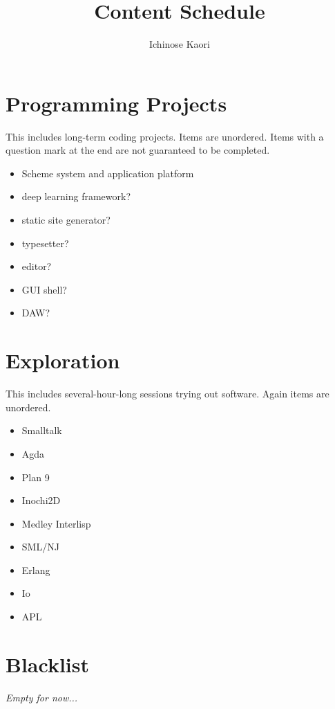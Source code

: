 \documentclass{article}
\title{Content Schedule}
\author{Ichinose Kaori}
\begin{document}
\maketitle

\section{Programming Projects}

This includes long-term coding projects. Items are unordered. Items with a question mark at the end are not guaranteed to be completed.

\begin{itemize}
\item Scheme system and application platform
\item deep learning framework?
\item static site generator?
\item typesetter?
\item editor?
\item GUI shell?
\item DAW?
\end{itemize}

\section{Exploration}

This includes several-hour-long sessions trying out software. Again items are unordered.

\begin{itemize}
\item Smalltalk
\item Agda
\item Plan 9
\item Inochi2D
\item Medley Interlisp
\item SML/NJ
\item Erlang
\item Io
\item APL
\end{itemize}

\section{Blacklist}

\textit{Empty for now...}
\end{document}
